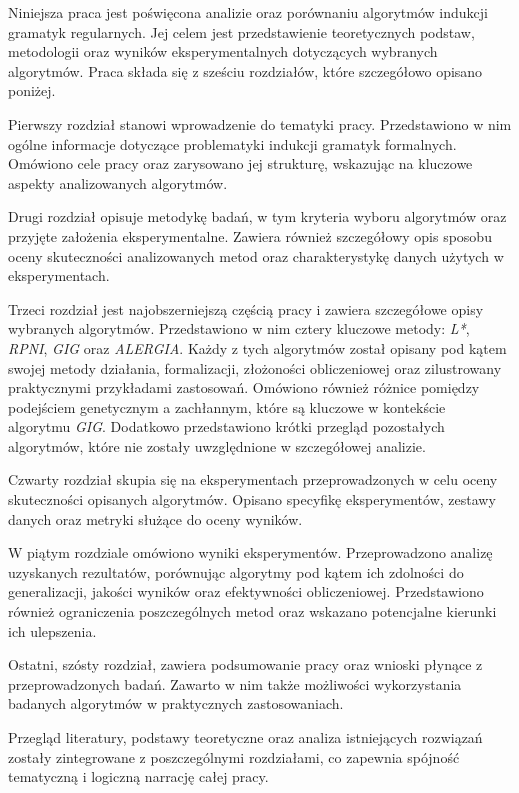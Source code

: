 Niniejsza praca jest poświęcona analizie oraz porównaniu algorytmów indukcji gramatyk regularnych. Jej celem jest przedstawienie teoretycznych podstaw, metodologii oraz wyników eksperymentalnych dotyczących wybranych algorytmów. Praca składa się z sześciu rozdziałów, które szczegółowo opisano poniżej.

Pierwszy rozdział stanowi wprowadzenie do tematyki pracy. Przedstawiono w nim ogólne informacje dotyczące problematyki indukcji gramatyk formalnych. Omówiono cele pracy oraz zarysowano jej strukturę, wskazując na kluczowe aspekty analizowanych algorytmów. 

Drugi rozdział opisuje metodykę badań, w tym kryteria wyboru algorytmów oraz przyjęte założenia eksperymentalne. Zawiera również szczegółowy opis sposobu oceny skuteczności analizowanych metod oraz charakterystykę danych użytych w eksperymentach. 

Trzeci rozdział jest najobszerniejszą częścią pracy i zawiera szczegółowe opisy wybranych algorytmów. Przedstawiono w nim cztery kluczowe metody: \textit{L*}, \textit{RPNI}, \textit{GIG} oraz \textit{ALERGIA}. Każdy z tych algorytmów został opisany pod kątem swojej metody działania, formalizacji, złożoności obliczeniowej oraz zilustrowany praktycznymi przykładami zastosowań. Omówiono również różnice pomiędzy podejściem genetycznym a zachłannym, które są kluczowe w kontekście algorytmu \textit{GIG}. Dodatkowo przedstawiono krótki przegląd pozostałych algorytmów, które nie zostały uwzględnione w szczegółowej analizie.

Czwarty rozdział skupia się na eksperymentach przeprowadzonych w celu oceny skuteczności opisanych algorytmów. Opisano specyfikę eksperymentów, zestawy danych oraz metryki służące do oceny wyników.

W piątym rozdziale omówiono wyniki eksperymentów. Przeprowadzono analizę uzyskanych rezultatów, porównując algorytmy pod kątem ich zdolności do generalizacji, jakości wyników oraz efektywności obliczeniowej. Przedstawiono również ograniczenia poszczególnych metod oraz wskazano potencjalne kierunki ich ulepszenia.

Ostatni, szósty rozdział, zawiera podsumowanie pracy oraz wnioski płynące z przeprowadzonych badań. Zawarto w nim także możliwości wykorzystania badanych algorytmów w praktycznych zastosowaniach.

Przegląd literatury, podstawy teoretyczne oraz analiza istniejących rozwiązań zostały zintegrowane z poszczególnymi rozdziałami, co zapewnia spójność tematyczną i logiczną narrację całej pracy.
